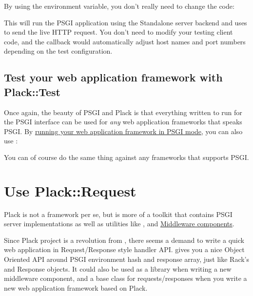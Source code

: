 
By using the environment variable, you don't really need to change the
 code:


This will run the PSGI application using the Standalone server backend
and uses  to send the live HTTP request. You don't need to
modify your testing client code, and the callback would automatically
adjust host names and port numbers depending on the test configuration.

\section{Test your web application framework with
Plack::Test}\label{test-your-web-application-framework-with-placktest}

Once again, the beauty of PSGI and Plack is that everything written to
run for the PSGI interface can be used for \emph{any} web application
frameworks that speaks PSGI. By
\href{http://advent.plackperl.org/2009/12/day-7-use-web-application-framework-in-psgi.html}{running
your web application framework in PSGI mode}, you can also use
:


You can of course do the same thing against any frameworks that supports
PSGI.

\chapter{Use Plack::Request}\label{day-14-use-plackrequest}

Plack is not a framework per se, but is more of a toolkit that contains
PSGI server implementations as well as utilities like
\href{http://advent.plackperl.org/2009/12/day-3-using-plackup.html}{},
\href{http://advent.plackperl.org/2009/12/day-13-use-placktest-to-test-your-application.html}{}
and
\href{http://advent.plackperl.org/2009/12/day-10-using-plack-middleware.html}{Middleware
components}.

Since Plack project is a revolution from
\href{http://search.cpan.org/perldoc?HTTP::Engine}{}, there
seems a demand to write a quick web application in Request/Response
style handler API.  gives you a nice Object Oriented API
around PSGI environment hash and response array, just like Rack's
 and Response objects. It could also be used as a library
when writing a new middleware component, and a base class for
requests/responses when you write a new web application framework based
on Plack.

